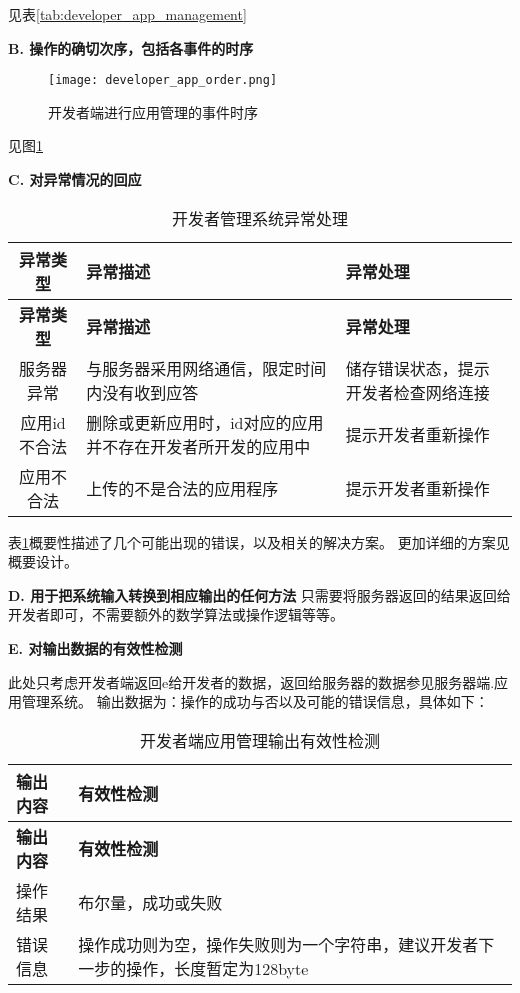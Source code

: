见表\ref{tab:developer_app_management}

\textbf{B. 操作的确切次序，包括各事件的时序}

\begin{figure}[ht]
	\centering
	\texttt{[image: developer\_app\_order.png]}
	\caption{开发者端进行应用管理的事件时序} \label{fig:developer_app_order}
\end{figure}
见图\ref{fig:developer_app_order}

\textbf{C. 对异常情况的回应}

\begin{longtable}{|c|p{6cm}|p{6cm}|}
\caption{开发者管理系统异常处理}\label{tab:developer_app_management_exception}\\
\hline
\textbf{异常类型} & \textbf{异常描述} & \textbf{异常处理}\\
\hline
\endfirsthead

\hline
\textbf{异常类型} & \textbf{异常描述} & \textbf{异常处理}\\
\hline
\endhead
\hline 
\endfoot
\hline
\endlastfoot
服务器异常 & 
与服务器采用网络通信，限定时间内没有收到应答 &
储存错误状态，提示开发者检查网络连接\\
应用id不合法 
& 删除或更新应用时，id对应的应用并不存在开发者所开发的应用中
& 提示开发者重新操作\\
应用不合法
& 上传的不是合法的应用程序
&提示开发者重新操作\\
\end{longtable}

表\ref{tab:developer_app_management_exception}概要性描述了几个可能出现的错误，以及相关的解决方案。
更加详细的方案见概要设计。

\textbf{D. 用于把系统输入转换到相应输出的任何方法}
只需要将服务器返回的结果返回给开发者即可，不需要额外的数学算法或操作逻辑等等。
		
\textbf{E. 对输出数据的有效性检测}

此处只考虑开发者端返回e给开发者的数据，返回给服务器的数据参见服务器端.应用管理系统。
输出数据为：操作的成功与否以及可能的错误信息，具体如下：
\begin{longtable}{|p{7cm}|p{7cm}|}
\caption{开发者端应用管理输出有效性检测}\label{tab:concrete_dev_sys_output_valid} \\
\hline
\textbf{输出内容} & \textbf{有效性检测} \\
\hline
\endfirsthead
\hline
\textbf{输出内容} & \textbf{有效性检测} \\
\hline
\endhead
\hline 
\endfoot
\hline
\endlastfoot

操作结果 & 布尔量，成功或失败 \\
错误信息 & 操作成功则为空，操作失败则为一个字符串，建议开发者下一步的操作，长度暂定为128byte\\
\end{longtable}


